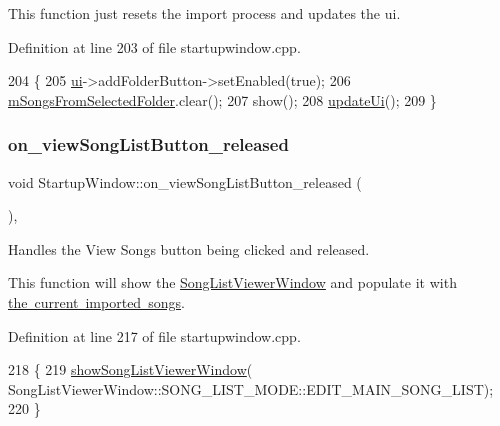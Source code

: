 This function just resets the import process and updates the ui. 

Definition at line 203 of file startupwindow.\+cpp.


\begin{DoxyCode}
204 \{
205     \mbox{\hyperlink{class_startup_window_a5afeeaabe9a34a02a67d2e7d9f36dc09}{ui}}->addFolderButton->setEnabled(\textcolor{keyword}{true});
206     \mbox{\hyperlink{class_startup_window_af419f4809f6fae0b370f1d9112dae9b4}{mSongsFromSelectedFolder}}.clear();
207     show();
208     \mbox{\hyperlink{class_startup_window_a910d56e4b640d6b7b27a6de2ae18d736}{updateUi}}();
209 \}
\end{DoxyCode}
\mbox{\label{class_startup_window_afb42686ecfc3556f38889ca53b4d458e}} 
\subsubsection{\texorpdfstring{on\+\_\+view\+Song\+List\+Button\+\_\+released}{on\_viewSongListButton\_released}}
{\footnotesize\ttfamily void Startup\+Window\+::on\+\_\+view\+Song\+List\+Button\+\_\+released (\begin{DoxyParamCaption}{ }\end{DoxyParamCaption})\hspace{0.3cm}{\ttfamily [private]}, {\ttfamily [slot]}}



Handles the View Songs button being clicked and released. 

This function will show the \mbox{\hyperlink{class_song_list_viewer_window}{Song\+List\+Viewer\+Window}} and populate it with \mbox{\hyperlink{class_startup_window_af419f4809f6fae0b370f1d9112dae9b4}{the current imported songs}}. 

Definition at line 217 of file startupwindow.\+cpp.


\begin{DoxyCode}
218 \{
219     \mbox{\hyperlink{class_startup_window_adc6941b3def8ed33a8925bef6ad82449}{showSongListViewerWindow}}(
      SongListViewerWindow::SONG\_LIST\_MODE::EDIT\_MAIN\_SONG\_LIST);
220 \}
\end{DoxyCode}
\mbox{\label{class_startup_window_adb01cfe36f641352bc2c24a7df6faebd}} 
